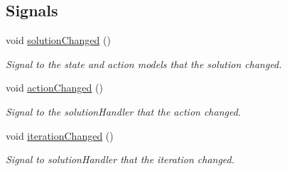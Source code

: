 \subsection*{Signals}
\begin{DoxyCompactItemize}
\item 
\mbox{\label{classSGPlotController_a8f7d30a1e5aaf22cd7e891f6a70518eb}} 
void \hyperlink{classSGPlotController_a8f7d30a1e5aaf22cd7e891f6a70518eb}{solution\+Changed} ()
\begin{DoxyCompactList}\small\item\em Signal to the state and action models that the solution changed. \end{DoxyCompactList}\item 
\mbox{\label{classSGPlotController_a5dae7775721c060e8d953a7f86e4aedf}} 
void \hyperlink{classSGPlotController_a5dae7775721c060e8d953a7f86e4aedf}{action\+Changed} ()
\begin{DoxyCompactList}\small\item\em Signal to the solution\+Handler that the action changed. \end{DoxyCompactList}\item 
\mbox{\label{classSGPlotController_ae24292f1d18e5eb5debb56e4e186c953}} 
void \hyperlink{classSGPlotController_ae24292f1d18e5eb5debb56e4e186c953}{iteration\+Changed} ()
\begin{DoxyCompactList}\small\item\em Signal to solution\+Handler that the iteration changed. \end{DoxyCompactList}\end{DoxyCompactItemize}
